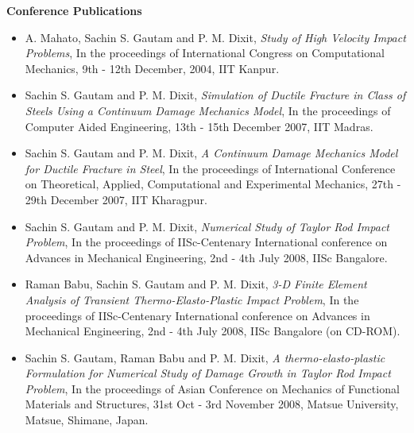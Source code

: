 \begin {center}
\textbf{\Large Conference Publications}
\end{center}
\begin{itemize}

    \item	A. Mahato, Sachin S. Gautam and P. M. Dixit, \emph{Study of High Velocity Impact Problems},
            In the proceedings of International Congress on Computational Mechanics,
            9th - 12th December, 2004, IIT Kanpur.

    \item	Sachin S. Gautam and P. M. Dixit, \emph{Simulation of Ductile Fracture in Class of
            Steels Using a Continuum Damage Mechanics Model}, In the proceedings of
            Computer Aided Engineering, 13th - 15th December 2007, IIT Madras.


    \item	Sachin S. Gautam and P. M. Dixit, \emph{A Continuum Damage Mechanics Model
            for Ductile Fracture in Steel}, In the proceedings of International Conference
            on Theoretical, Applied, Computational and Experimental Mechanics,
            27th - 29th December 2007, IIT Kharagpur.

    \item	Sachin S. Gautam and P. M. Dixit, \emph{Numerical Study of Taylor Rod Impact Problem},
            In the proceedings of  IISc-Centenary International conference on Advances in
            Mechanical Engineering, 2nd - 4th July 2008, IISc Bangalore.

    \item	Raman Babu, Sachin S. Gautam and P. M. Dixit, \emph{3-D Finite Element Analysis
            of Transient Thermo-Elasto-Plastic Impact Problem}, In the proceedings of
            IISc-Centenary International conference on Advances in Mechanical
            Engineering, 2nd - 4th July 2008, IISc Bangalore (on CD-ROM).

    \item Sachin S. Gautam, Raman Babu and P. M. Dixit, \emph{A thermo-elasto-plastic
          Formulation for Numerical Study of Damage Growth in Taylor Rod Impact Problem},
          In the proceedings of  Asian Conference on Mechanics of Functional Materials and
          Structures, 31st Oct - 3rd November 2008, Matsue University, Matsue, Shimane, Japan.

\end{itemize} 
